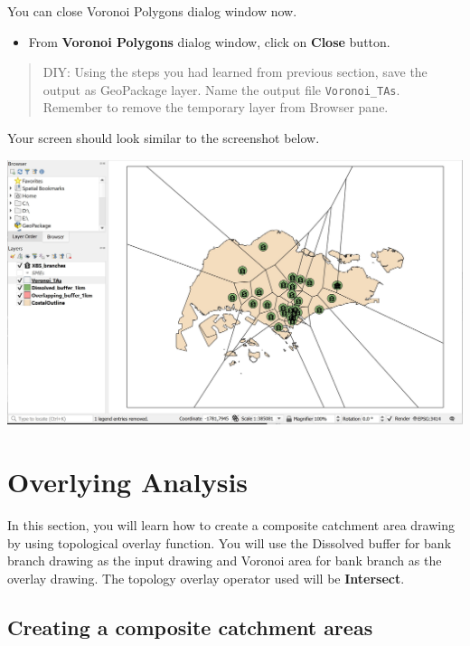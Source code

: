 \documentclass[
  letterpaper,
  DIV=11,
  numbers=noendperiod]{scrreprt}
\providecommand{\tightlist}{%
  \setlength{\itemsep}{0pt}\setlength{\parskip}{0pt}}\usepackage{longtable,booktabs,array}
\begin{document}
You can close Voronoi Polygons dialog window now.

\begin{itemize}
\tightlist
\item
  From \textbf{Voronoi Polygons} dialog window, click on \textbf{Close}
  button.
\end{itemize}

\begin{quote}
DIY: Using the steps you had learned from previous section, save the
output as GeoPackage layer. Name the output file \texttt{Voronoi\_TAs}.
Remember to remove the temporary layer from Browser pane.
\end{quote}

Your screen should look similar to the screenshot below.

\includegraphics{./img05/image23.jpg}

\hypertarget{overlying-analysis}{%
\section{Overlying Analysis}\label{overlying-analysis}}

In this section, you will learn how to create a composite catchment area
drawing by using topological overlay function. You will use the
Dissolved buffer for bank branch drawing as the input drawing and
Voronoi area for bank branch as the overlay drawing. The topology
overlay operator used will be \textbf{Intersect}.

\hypertarget{creating-a-composite-catchment-areas}{%
\subsection{Creating a composite catchment
areas}\label{creating-a-composite-catchment-areas}}
\end{document}
